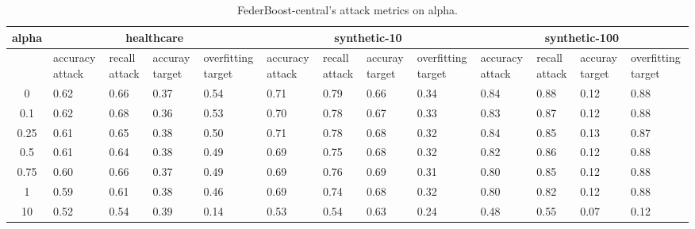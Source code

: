 \begin{table*}[]\centering
\begin{tabular}{|c| *{12}{m{1.0cm}|}}
\hline\rowcolor{gray!50}
\cellcolor{gray!80} alpha & \multicolumn{4}{c|}{healthcare} & \multicolumn{4}{c|}{synthetic-10} & \multicolumn{4}{c|}{synthetic-100}\\\hline 
& accuracy attack & recall attack & accuray target & overfitting target & accuracy attack & recall attack & accuray target & overfitting target & accuracy attack & recall attack & accuray target & overfitting target\\\hline
0 & 0.62 & 0.66 & 0.37 & 0.54 & 0.71 & 0.79 & 0.66 & 0.34 & 0.84 & 0.88 & 0.12 & 0.88\\ \hline
0.1 & 0.62 & 0.68 & 0.36 & 0.53 & 0.70 & 0.78 & 0.67 & 0.33 & 0.83 & 0.87 & 0.12 & 0.88\\ \hline
0.25 & 0.61 & 0.65 & 0.38 & 0.50 & 0.71 & 0.78 & 0.68 & 0.32 & 0.84 & 0.85 & 0.13 & 0.87\\ \hline
0.5 & 0.61 & 0.64 & 0.38 & 0.49 & 0.69 & 0.75 & 0.68 & 0.32 & 0.82 & 0.86 & 0.12 & 0.88\\ \hline
0.75 & 0.60 & 0.66 & 0.37 & 0.49 & 0.69 & 0.76 & 0.69 & 0.31 & 0.80 & 0.85 & 0.12 & 0.88\\ \hline
1 & 0.59 & 0.61 & 0.38 & 0.46 & 0.69 & 0.74 & 0.68 & 0.32 & 0.80 & 0.82 & 0.12 & 0.88\\ \hline
10 & 0.52 & 0.54 & 0.39 & 0.14 & 0.53 & 0.54 & 0.63 & 0.24 & 0.48 & 0.55 & 0.07 & 0.12\\ \hline
\end{tabular} 
\caption{FederBoost-central's attack metrics on alpha.}
\label{tab:experiment1_alpha}
\end{table*}
